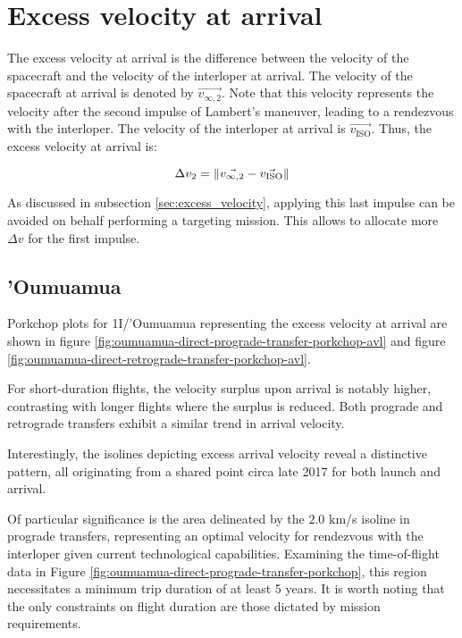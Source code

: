 \section{Excess velocity at arrival}

The excess velocity at arrival is the difference between the velocity of the
spacecraft and the velocity of the interloper at arrival. The
velocity of the spacecraft at arrival is denoted by $\vec{v_{\infty ,2}}$. Note
that this velocity represents the velocity after the second impulse of Lambert's
maneuver, leading to a rendezvous with the interloper. The velocity of the
interloper at arrival is $\vec{v_\text{ISO}}$. Thus, the excess velocity at
arrival is:

\begin{equation}
  \Delta v_2 = \lVert\vec{v_{\infty ,2}} - \vec{v_\text{ISO}}\rVert
\end{equation}

As discussed in subsection \ref{sec:excess_velocity}, applying this last impulse
can be avoided on behalf performing a targeting mission. This allows to allocate
more $\Delta v$ for the first impulse.

\subsection{'Oumuamua}

Porkchop plots for 1I/'Oumuamua representing the excess velocity at arrival are
shown in figure \ref{fig:oumuamua-direct-prograde-transfer-porkchop-avl} and figure
\ref{fig:oumuamua-direct-retrograde-transfer-porkchop-avl}.

For short-duration flights, the velocity surplus upon arrival is notably higher,
contrasting with longer flights where the surplus is reduced. Both prograde and
retrograde transfers exhibit a similar trend in arrival velocity.

Interestingly, the isolines depicting excess arrival velocity reveal a
distinctive pattern, all originating from a shared point circa late 2017 for
both launch and arrival.

Of particular significance is the area delineated by the $2.0$ km/s isoline in
prograde transfers, representing an optimal velocity for rendezvous with the
interloper given current technological capabilities. Examining the
time-of-flight data in Figure
\ref{fig:oumuamua-direct-prograde-transfer-porkchop}, this region necessitates a
minimum trip duration of at least 5 years. It is worth noting that the only
constraints on flight duration are those dictated by mission requirements.

